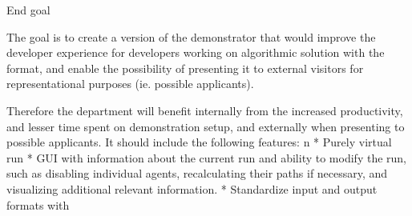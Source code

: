 \sec End goal

The goal is to create a version of the demonstrator that would improve the developer experience for developers working on algorithmic solution with the {\mapfIR} format, and enable the possibility of presenting it to external visitors for representational purposes (ie. possible applicants).

Therefore the department will benefit internally from the increased productivity, and lesser time spent on demonstration setup, and externally when presenting to possible applicants.
It should include the following features:
\begitems \style n
    * Purely virtual run
    * GUI with information about the current run and ability to modify the run, such as disabling individual agents, recalculating their paths if necessary, and visualizing additional relevant information.
    * Standardize input and output formats with \mapfIR
\enditems